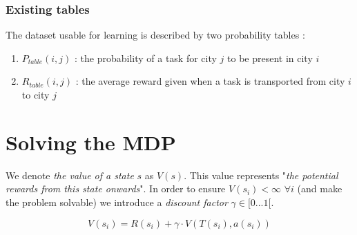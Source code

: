 \documentclass[11pt]{article}
\begin{document}
\subsubsection{Existing tables}

The dataset usable for learning is described by two probability tables :

\begin{enumerate}
    \item $P_{table}(i,j)$ : the probability of a task for city $j$ to be present in city $i$
    \item $R_{table}(i,j)$ : the average reward given when a task is transported from city $i$ to city $j$
\end{enumerate}

\newpage

\section{Solving the MDP}

We denote \textit{the value of a state} $s$ as $V(s)$. This value represents "\textit{the potential rewards from this state onwards}". In order to ensure $V(s_i) < \infty$ $\forall i$ (and make the problem solvable) we introduce a \textit{discount factor} $\gamma \in [0 ... 1 [$.

\[V(s_i) = R(s_i) + \gamma \cdot V(T(s_i),a(s_i))\]
\end{document}

